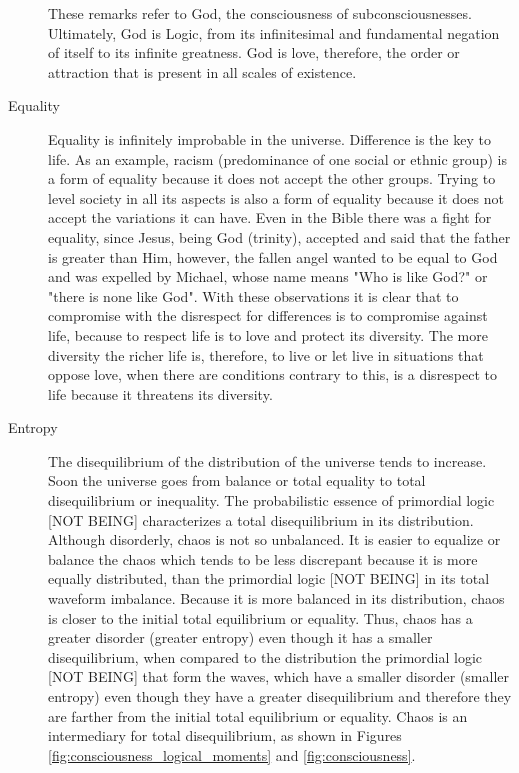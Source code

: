\begin{description}
\begin{description}
	   \end{description}
	These remarks refer to God, the consciousness of subconsciousnesses. Ultimately, God is Logic, from its infinitesimal and fundamental negation of itself to its infinite greatness. God is love, therefore, the order or attraction that is present in all scales of existence.
	   \item[Equality] Equality is infinitely improbable in the universe. Difference is the key to life. As an example, racism (predominance of one social or ethnic group) is a form of equality because it does not accept the other groups. Trying to level society in all its aspects is also a form of equality because it does not accept the variations it can have. Even in the Bible there was a fight for equality, since Jesus, being God (trinity), accepted and said that the father is greater than Him, however, the fallen angel wanted to be equal to God and was expelled by Michael, whose name means "Who is like God?" or "there is none like God". With these observations it is clear that to compromise with the disrespect for differences is to compromise against life, because to respect life is to love and protect its diversity. The more diversity the richer life is, therefore, to live or let live in situations that oppose love, when there are conditions contrary to this, is a disrespect to life because it threatens its diversity.
	   \item[Entropy] The disequilibrium of the distribution of the universe tends to increase. Soon the universe goes from balance or total equality to total disequilibrium or inequality. The probabilistic essence of primordial logic [NOT BEING] characterizes a total disequilibrium in its distribution. Although disorderly, chaos is not so unbalanced. It is easier to equalize or balance the chaos which tends to be less discrepant because it is more equally distributed, than the primordial logic [NOT BEING] in its total waveform imbalance. Because it is more balanced in its distribution, chaos is closer to the initial total equilibrium or equality. Thus, chaos has a greater disorder (greater entropy) even though it has a smaller disequilibrium, when compared to the distribution the primordial logic [NOT BEING] that form the waves, which have a smaller disorder (smaller entropy) even though they have a greater disequilibrium and therefore they are farther from the initial total equilibrium or equality. Chaos is an intermediary for total disequilibrium, as shown in Figures \ref{fig:consciousness_logical_moments} and \ref{fig:consciousness}. 

\end{description}
